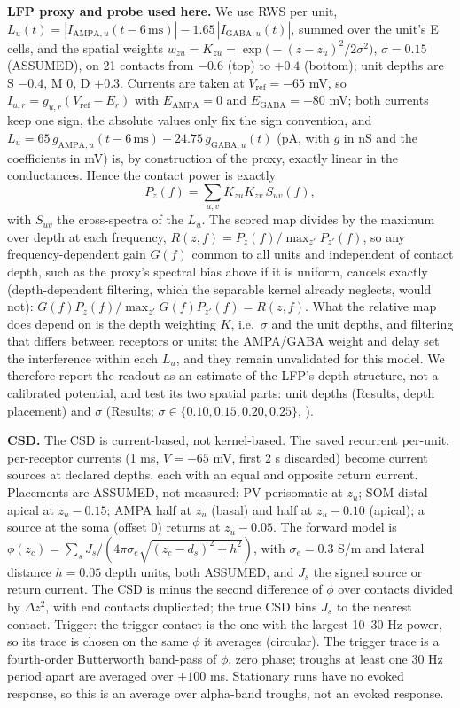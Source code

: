 \textbf{LFP proxy and probe used here.} We use RWS per unit, $L_u(t) = |I_{\text{AMPA},u}(t - 6\,\text{ms})| -
1.65\,|I_{\text{GABA},u}(t)|$, summed over the unit's E cells, and the spatial weights $w_{zu} = K_{zu} =
\exp\bigl(-(z-z_u)^2/2\sigma^2\bigr)$, $\sigma = 0.15$ (ASSUMED), on 21 contacts from $-0.6$ (top) to $+0.4$
(bottom); unit depths are S $-0.4$, M 0, D $+0.3$. Currents are taken at $V_\text{ref} = -65$ mV, so $I_{u,r} =
g_{u,r}(V_\text{ref} - E_r)$ with $E_\text{AMPA} = 0$ and $E_\text{GABA} = -80$ mV; both currents keep one sign, the
absolute values only fix the sign convention, and $L_u = 65\,g_{\text{AMPA},u}(t-6\,\text{ms}) - 24.75\,
g_{\text{GABA},u}(t)$ (pA, with $g$ in nS and the coefficients in mV) is, by construction of the proxy, exactly linear in the conductances. Hence the contact power is exactly
\begin{equation*}
P_z(f) = \sum_{u,v} K_{zu} K_{zv}\, S_{uv}(f),
\end{equation*}
with $S_{uv}$ the cross-spectra of the $L_u$. The scored map divides by the maximum over depth at each frequency,
$R(z,f) = P_z(f)/\max_{z'} P_{z'}(f)$, so any frequency-dependent gain $G(f)$ common to all units and
independent of contact depth, such as the proxy's spectral bias above if it is uniform, cancels exactly
(depth-dependent filtering, which the separable kernel already neglects, would not): $G(f)P_z(f)/\max_{z'}
G(f)P_{z'}(f) = R(z,f)$. What the relative map does depend on is the depth weighting $K$, i.e.\ $\sigma$ and the unit
depths, and filtering that differs between receptors or units: the AMPA/GABA weight and delay set the interference
within each $L_u$, and they remain unvalidated for this model. We therefore report the readout as an estimate of
the LFP's depth structure, not a calibrated potential, and test its two spatial parts: unit depths (Results, depth placement)
and $\sigma$ (Results; $\sigma \in \{0.10, 0.15, 0.20, 0.25\}$, ).

\textbf{CSD.} The CSD is current-based, not kernel-based. The saved recurrent per-unit, per-receptor currents (1 ms, $V = -65$ mV,
first 2 s discarded) become current sources at declared depths, each with an equal and opposite return current.
Placements are ASSUMED, not measured: PV perisomatic at $z_u$; SOM distal apical at $z_u - 0.15$; AMPA half at $z_u$
(basal) and half at $z_u - 0.10$ (apical); a source at the soma (offset 0) returns at $z_u - 0.05$. The forward model
is $\phi(z_c) = \sum_s J_s / (4\pi\sigma_e\sqrt{(z_c - d_s)^2 + h^2})$, with $\sigma_e = 0.3$ S/m and lateral distance
$h = 0.05$ depth units, both ASSUMED, and $J_s$ the signed source or return current. The CSD is minus the second
difference of $\phi$ over contacts divided by $\Delta z^2$, with end contacts duplicated; the true CSD bins $J_s$ to
the nearest contact. Trigger: the trigger contact is the one with the largest 10--30 Hz power, so its trace is chosen
on the same $\phi$ it averages (circular). The trigger trace is a fourth-order Butterworth band-pass of $\phi$, zero
phase; troughs at least one 30 Hz period apart are averaged over $\pm 100$ ms. Stationary runs have no evoked
response, so this is an average over alpha-band troughs, not an evoked response.

